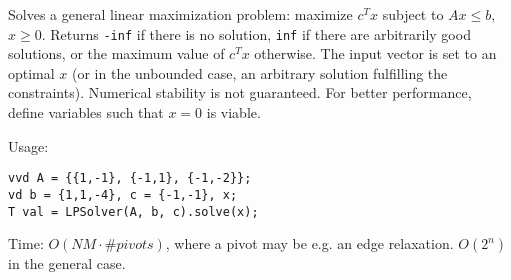 Solves a general linear maximization problem: maximize $c^T x$ subject to $Ax \le b$, $x \ge 0$.
Returns \lstinline{-inf} if there is no solution, \lstinline{inf} if there are arbitrarily good solutions, or the maximum value of $c^T x$ otherwise. The input vector is set to an optimal $x$ (or in the unbounded case, an arbitrary solution fulfilling the constraints). Numerical stability is not guaranteed. For better performance, define variables such that $x = 0$ is viable.

Usage:
\begin{lstlisting}
vvd A = {{1,-1}, {-1,1}, {-1,-2}};
vd b = {1,1,-4}, c = {-1,-1}, x;
T val = LPSolver(A, b, c).solve(x);
\end{lstlisting}
Time: $O(NM \cdot \#pivots)$, where a pivot may be e.g. an edge relaxation. $O(2^n)$ in the general case.
